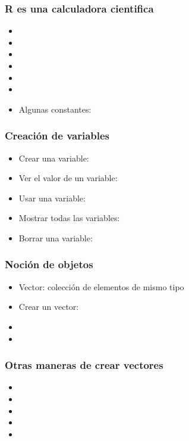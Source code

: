 \documentclass[mathserif]{beamer}
\begin{document}
\begin{frame}[plain,label=d10]%
   \frametitle{R es una calculadora cientifica}
   \begin{itemize}
     \item {}
     \item {}
     \item {}
     \item {}
     \item {}
     \item {}
      \item  Algunas constantes: 
   \end{itemize}
\end{frame}%

\begin{frame}[plain,label=d11]%
   \frametitle{Creaci\'on de variables}
   \begin{itemize}
      \item Crear una variable: 
      \item Ver el valor de un variable: 
      \item Usar una variable: 
      \item Mostrar todas las variables: 
      \item Borrar una variable: 
   \end{itemize}
\end{frame}%

\begin{frame}[plain,label=d12]%
   \frametitle{Noci\'on de objetos}
   \begin{itemize}
      \item Vector: colecci\'on de elementos de mismo tipo
      \item Crear un vector: 
      \item {}
      \item {}
   \end{itemize}
\end{frame}%

\begin{frame}[plain,label=d13]%
   \frametitle{Otras maneras de crear vectores}
   \begin{itemize}
     \item {}
     \item {}
     \item {}
     \item {}
     \item {}
   \end{itemize}
\end{frame}%
\end{document}
